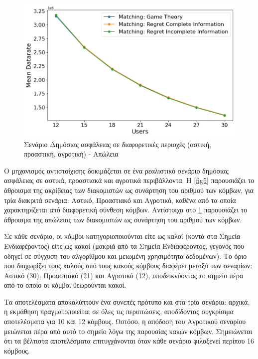 \begin{figure}[H]
    \centering
    \includegraphics[width=\textwidth]{figures/chapter4/Mean_Datarate_vs_Users.png}
    \caption{Σενάριο Δημόσιας ασφάλειας σε διαφορετικές περιοχές (αστική, προαστική, αγροτική) - Απώλεια}
    \label{fig6}
\end{figure}

\newpage

Ο μηχανισμός αντιστοίχισης δοκιμάζεται σε ένα ρεαλιστικό σενάριο δημόσιας ασφάλειας σε αστικά, προαστιακά και αγροτικά περιβάλλοντα. Η \ref{fig5} παρουσιάζει το άθροισμα της ακρίβειας των διακομιστών ως συνάρτηση του αριθμού των κόμβων, για τρία διακριτά σενάρια: Αστικό, Προαστιακό και Αγροτικό, καθένα από τα οποία χαρακτηρίζεται από διαφορετική σύνθεση κόμβων. Αντίστοιχα στο \ref{fig6} παρουσιάζει το άθροισμα της απώλειας των διακομιστών ως συνάρτηση του αριθμού των κόμβων.

Σε κάθε σενάριο, οι κόμβοι κατηγοριοποιούνται είτε ως καλοί (κοντά στα Σημεία Ενδιαφέροντος) είτε ως κακοί (μακριά από τα Σημεία Ενδιαφέροντος, γεγονός που οδηγεί σε σύγχυση του αλγορίθμου και μειωμένη χρησιμότητα δεδομένων). Το όριο που διαχωρίζει τους καλούς από τους κακούς κόμβους διαφέρει μεταξύ των σεναρίων: Αστικό (30), Προαστιακό (21) και Αγροτικό (12), υποδεικνύοντας το σημείο πέρα από το οποίο οι κόμβοι θεωρούνται κακοί.

Τα αποτελέσματα αποκαλύπτουν ένα συνεπές πρότυπο και στα τρία σενάρια: αρχικά, η εκμάθηση πραγματοποιείται σε όλες τις περιπτώσεις, αποδίδοντας συγκρίσιμα αποτελέσματα για 10 και 12 κόμβους. Ωστόσο, η απόδοση του Αγροτικού σεναρίου μειώνεται πέρα από αυτό το σημείο λόγω της παρουσίας κακών κόμβων. Σημειώνεται ότι τα βέλτιστα αποτελέσματα επιτυγχάνονται όταν κάθε σενάριο φιλοξενεί περίπου 16 κόμβους.

